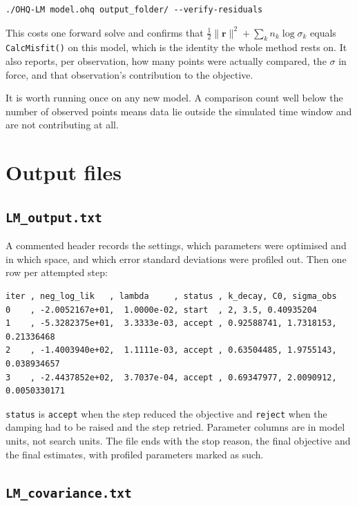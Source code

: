 \documentclass[11pt,a4paper]{article}
\newcommand{\code}[1]{\texttt{\small #1}}
\newcommand{\file}[1]{\texttt{\small #1}}
\begin{document}
\begin{lstlisting}
./OHQ-LM model.ohq output_folder/ --verify-residuals
\end{lstlisting}

This costs one forward solve and confirms that
$\tfrac{1}{2}\lVert\mathbf{r}\rVert^{2} + \sum_k n_k\log\sigma_k$ equals
\code{CalcMisfit()} on this model, which is the identity the whole method rests
on. It also reports, per observation, how many points were actually compared,
the $\sigma$ in force, and that observation's contribution to the objective.

It is worth running once on any new model. A comparison count well below the
number of observed points means data lie outside the simulated time window and
are not contributing at all.

\section{Output files}

\subsection{\file{LM\_output.txt}}

A commented header records the settings, which parameters were optimised and in
which space, and which error standard deviations were profiled out. Then one row
per attempted step:

\begin{lstlisting}
iter , neg_log_lik   , lambda     , status , k_decay, C0, sigma_obs
0    , -2.0052167e+01,  1.0000e-02, start  , 2, 3.5, 0.40935204
1    , -5.3282375e+01,  3.3333e-03, accept , 0.92588741, 1.7318153, 0.21336468
2    , -1.4003940e+02,  1.1111e-03, accept , 0.63504485, 1.9755143, 0.038934657
3    , -2.4437852e+02,  3.7037e-04, accept , 0.69347977, 2.0090912, 0.0050330171
\end{lstlisting}

\code{status} is \code{accept} when the step reduced the objective and
\code{reject} when the damping had to be raised and the step retried. Parameter
columns are in model units, not search units. The file ends with the stop
reason, the final objective and the final estimates, with profiled parameters
marked as such.

\subsection{\file{LM\_covariance.txt}}
\end{document}

